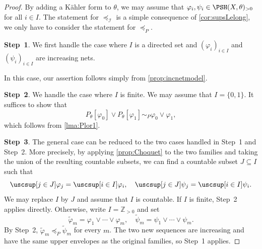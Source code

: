 \begin{proof}
    By adding a Kähler form to $\theta$, we may assume that $\varphi_i,\psi_i\in \PSH(X,\theta)_{>0}$ for all $i\in I$. The statement for $\preceq_{\mathcal{I}}$ is a simple consequence of \cref{cor:supsLelong}, we only have to consider the statement for $\preceq_P$.

    \textbf{Step~1}. We first handle the case where $I$ is a directed set and $(\varphi_i)_{i\in I}$ and $(\psi_i)_{i\in I}$ are increasing nets.

   In this case,  our assertion follows simply from \cref{prop:incnetmodel}.

    \textbf{Step~2}. We handle the case where $I$ is finite. We may assume that $I=\{0,1\}$.
    It suffices to show that
    \[
        P_{\theta}[\varphi_0]\lor P_{\theta}[\varphi_1]\sim_P \varphi_0\lor\varphi_1,
    \]
    which follows from \cref{lma:Plor1}.

    \textbf{Step~3}. The general case can be reduced to the two cases handled in Step~1 and Step~2. More precisely,
    by applying \cref{prop:Choquet} to the two families and taking the union of the resulting countable subsets, we can find a countable subset $J\subseteq I$ such that
    \[
    \uscsup[j\in J] \varphi_j=\uscsup[i\in I] \varphi_i,\quad \uscsup[j\in J] \psi_j=\uscsup[i\in I] \psi_i.
    \]
    We may replace $I$ by $J$ and assume that $I$ is countable. If $I$ is finite, Step~2 applies directly. Otherwise, write $I=\mathbb{Z}_{>0}$ and set
    \[
        \tilde{\varphi}_m=\varphi_1\lor\cdots\lor\varphi_m,\quad
        \tilde{\psi}_m=\psi_1\lor\cdots\lor\psi_m.
    \]
    By Step~2, $\tilde{\varphi}_m\preceq_P\tilde{\psi}_m$ for every $m$. The two new sequences are increasing and have the same upper envelopes as the original families, so Step~1 applies.

\end{proof}

